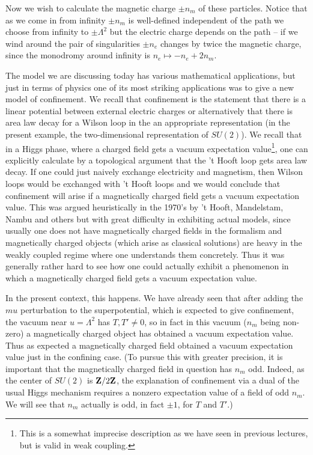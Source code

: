 \documentclass[10pt]{article}
\begin{document}
Now we wish to calculate the magnetic charge $\pm n_m$ of these particles.
Notice that as we come in from infinity $\pm n_m$ is well-defined
independent of the path we choose from infinity to $\pm \Lambda^2$ but
the electric charge depends on the path -- if we wind around the pair
of singularities $\pm n_e$ changes by twice the magnetic charge, since
the monodromy around infinity is $n_e\mapsto -n_e+2n_m$. 



The model we are discussing today has various mathematical applications,
but just in terms of physics one of its most striking applications
was to give a new model of confinement.  We recall that confinement is
the statement that there is a 
linear potential between  external electric charges or alternatively
that there is  area
law decay for a Wilson loop in the  an appropriate representation
(in the present example, the two-dimensional representation of $SU(2)$).
We recall that in  a Higgs phase, where a charged field gets a vacuum
expectation value\footnote{This is a somewhat imprecise description as we have
seen in previous lectures, but is valid in weak  coupling.}, one can
explicitly calculate by a topological argument that the 't Hooft loop
gets area law decay.  If one could just naively exchange electricity and
magnetism, then Wilson loops would be exchanged with 't Hooft loops
and we would conclude  that confinement will arise if a magnetically
charged field gets a vacuum expectation value.  This was
argued heuristically in the 1970's by 't Hooft,
Mandelstam, Nambu and others but with great difficulty in exhibiting
actual models, since usually one does not have magnetically charged
fields in the formalism 
and magnetically charged objects (which arise as classical solutions)
are heavy in the weakly
coupled regime where one understands them concretely.  Thus it was generally
rather hard to see how one could actually exhibit a phenomenon in which
a magnetically charged field gets a vacuum expectation value.



In the present context, this happens.  We have already seen
that after adding the $mu$ perturbation to the superpotential, which
is expected to give confinement,
 the vacuum near $u=\Lambda^2$ has $T,T'\not=0$, so in fact in this
vacuum ($n_m$ being non-zero) a magnetically charged object has obtained
a vacuum expectation value.  Thus as expected a magnetically charged
field obtained a vacuum expectation value just in the confining case.
(To pursue this with greater precision, it is important that the magnetically
charged field in question has $n_m$ odd.  Indeed, as the center of $SU(2)$
is ${\bf Z}/2{\bf Z}$, the explanation of confinement via a dual of the usual
Higgs mechanism requires a nonzero expectation value of a field of
odd $n_m$.  We will see that $n_m$ actually is odd, in fact $\pm 1$,
for $T$ and $T'$.)  
\end{document}
